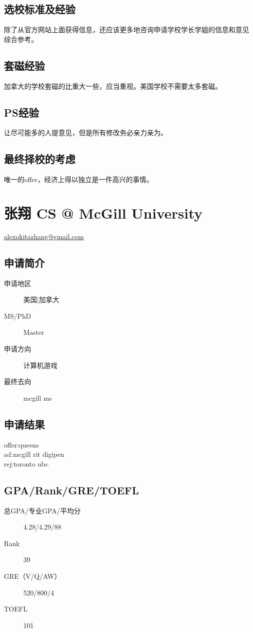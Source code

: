 \documentclass[11pt,fleqn,openany]{book} %
\begin{document}
\subsection*{选校标准及经验}
除了从官方网站上面获得信息，还应该更多地咨询申请学校学长学姐的信息和意见综合参考。
\subsection*{套磁经验}
加拿大的学校套磁的比重大一些，应当重视。美国学校不需要太多套磁。
\subsection*{PS经验}
让尽可能多的人提意见，但是所有修改务必亲力亲为。
\subsection*{最终择校的考虑}
唯一的offer，经济上得以独立是一件高兴的事情。
\clearpage
\section{张翔 CS @ McGill University}
\hfill \href{mailto:alexokitazhang@gmail.com}{alexokitazhang@gmail.com}

\noindent\begin{minipage}[t]{0.45\textwidth}
\subsection*{申请简介}
\begin{description}
\item[申请地区] 美国|加拿大
\item[MS/PhD] Master
\item[申请方向] 计算机游戏
\item[最终去向] mcgill ms
\end{description}
\end{minipage}
\hfill
\begin{minipage}[t]{0.45\textwidth}
\subsection*{申请结果}
\noindent offer:queens\\
ad:mcgill rit digipen\\
rej:toronto ubc
\end{minipage}
\subsection*{GPA/Rank/GRE/TOEFL}
\begin{description}
\item[总GPA/专业GPA/平均分] 4.28/4.29/88
\item[Rank] 39
\item[GRE（V/Q/AW）] 520/800/4
\item[TOEFL] 101
\end{description}
\end{document}

